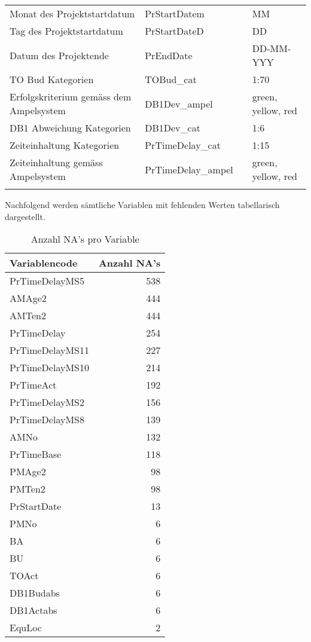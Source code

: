 \begin{landscape}
\begin{center}
\begin{longtable}{p{6cm}|p{4cm}|p{6cm}|p{3cm}}
			Monat des Projektstartdatum & PrStartDatem &       & MM \\
			Tag des Projektstartdatum & PrStartDateD &       & DD \\
			Datum des Projektende & PrEndDate &       & DD-MM-YYY \\
			TO Bud Kategorien & TOBud\_cat &       & {1:70} \\
			Erfolgskriterium gemäss dem Ampelsystem & DB1Dev\_ampel &       & {green, yellow, red} \\
			DB1 Abweichung Kategorien & DB1Dev\_cat &       & {1:6} \\
			Zeiteinhaltung Kategorien & PrTimeDelay\_cat &       & {1:15} \\
			Zeiteinhaltung gemäss Ampelsystem & PrTimeDelay\_ampel &       & {green, yellow, red} \\		
			\label{tab:addlabel}%
		\end{longtable}%
	\end{center}
\end{landscape}
Nachfolgend werden sämtliche Variablen mit fehlenden Werten tabellarisch dargestellt.
\begin{table}[htbp]
	\centering
	\caption{Anzahl NA's pro Variable}
	\begin{tabular}{lr}
		\textbf{Variablencode} & \multicolumn{1}{l}{\textbf{Anzahl NA's}} \\\hline
		PrTimeDelayMS5 & 538 \\
		AMAge2 & 444 \\
		AMTen2 & 444 \\
		PrTimeDelay & 254 \\
		PrTimeDelayMS11 & 227 \\
		PrTimeDelayMS10 & 214 \\
		PrTimeAct & 192 \\
		PrTimeDelayMS2 & 156 \\
		PrTimeDelayMS8 & 139 \\
		AMNo  & 132 \\
		PrTimeBase & 118 \\
		PMAge2 & 98 \\
		PMTen2 & 98 \\
		PrStartDate & 13 \\
		PMNo  & 6 \\
		BA    & 6 \\
		BU    & 6 \\
		TOAct & 6 \\
		DB1Budabs & 6 \\
		DB1Actabs & 6 \\
		EquLoc & 2 \\
	\end{tabular}%
	\label{tab:addlabel}%
\end{table}%
